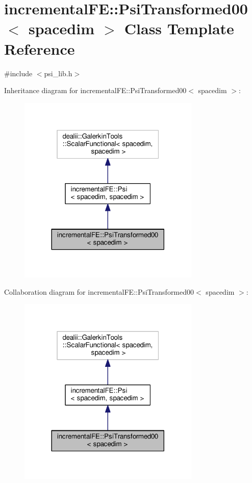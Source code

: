 \hypertarget{classincremental_f_e_1_1_psi_transformed00}{}\section{incremental\+FE\+:\+:Psi\+Transformed00$<$ spacedim $>$ Class Template Reference}
\label{classincremental_f_e_1_1_psi_transformed00}


{\ttfamily \#include $<$psi\+\_\+lib.\+h$>$}



Inheritance diagram for incremental\+FE\+:\+:Psi\+Transformed00$<$ spacedim $>$\+:\nopagebreak
\begin{figure}[H]
\begin{center}
\leavevmode
\includegraphics[width=245pt]{classincremental_f_e_1_1_psi_transformed00__inherit__graph}
\end{center}
\end{figure}


Collaboration diagram for incremental\+FE\+:\+:Psi\+Transformed00$<$ spacedim $>$\+:\nopagebreak
\begin{figure}[H]
\begin{center}
\leavevmode
\includegraphics[width=245pt]{classincremental_f_e_1_1_psi_transformed00__coll__graph}
\end{center}
\end{figure}
